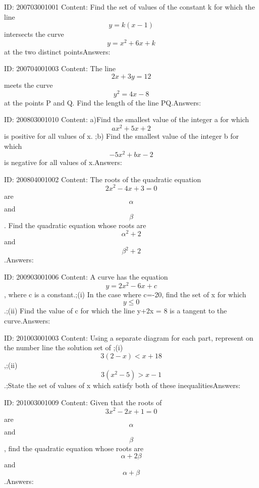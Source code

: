 \documentclass{article}
\begin{document}
ID: 200703001001
Content:
Find the set of values of the constant k for which the line $$y=k(x-1)$$  intersects the curve $$y=x^2+6x+k$$  at the two distinct pointsAnswers:

ID: 200704001003
Content:
The line $$2x+3y=12$$ meets the curve $$y^2=4x-8$$ at the points P and Q. Find the length of the line PQ.Answers:

ID: 200803001010
Content:
a)Find the smallest value of the integer a for which $$ax^2 + 5x + 2$$ is positive for all values of x. ;b) Find the smallest value of the integer b for which $$-5x^2 + bx - 2$$ is negative for all values of x.Answers:

ID: 200804001002
Content:
The roots of the quadratic equation $$2x^2 -4x+3 =0$$ are $$\alpha$$ and $$\beta$$. Find the quadratic equation whose roots are $$\alpha^2 + 2$$ and $$\beta^2 +2$$.Answers:

ID: 200903001006
Content:
A curve has the equation $$y = 2x^2 -6x +c$$, where c is a constant.;(i) In the case where c=-20, find the set of x for which $$y\leq0$$.;(ii) Find the value of c for which the line y+2x = 8 is a tangent to the curve.Answers:

ID: 201003001003
Content:
Using a separate diagram for each part, represent on the number line the solution set of ;(i) $$3(2-x) < x+18$$,;(ii) $$3(x^2 -5) > x-1$$ .;State the set of values of x which satisfy both of these inequalitiesAnswers:

ID: 201003001009
Content:
Given that the roots of $$3x^2-2x+1=0$$ are $$\alpha$$ and $$\beta$$, find the quadratic equation whose roots are $$\alpha + 2\beta$$ and $$\alpha + \beta$$.Answers:
\end{document}
